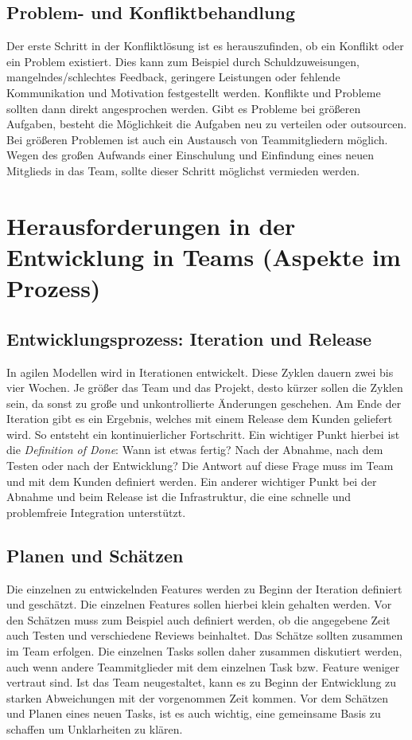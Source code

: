 \subsection{Problem- und Konfliktbehandlung}
Der erste Schritt in der Konfliktlösung ist es herauszufinden, ob ein Konflikt oder ein Problem existiert. Dies kann zum Beispiel durch Schuldzuweisungen, mangelndes/schlechtes Feedback, geringere Leistungen oder fehlende Kommunikation und Motivation festgestellt werden. Konflikte und Probleme sollten dann direkt angesprochen werden. Gibt es Probleme bei größeren Aufgaben, besteht die Möglichkeit die Aufgaben neu zu verteilen oder outsourcen. Bei größeren Problemen ist auch ein Austausch von Teammitgliedern möglich. Wegen des großen Aufwands einer Einschulung und Einfindung eines neuen Mitglieds in das Team, sollte dieser Schritt möglichst vermieden werden. 
\section{Herausforderungen in der Entwicklung in Teams (Aspekte im Prozess)}
\subsection{Entwicklungsprozess: Iteration und Release}
In agilen Modellen wird in Iterationen entwickelt. Diese Zyklen dauern zwei bis vier Wochen. Je größer das Team und das Projekt, desto kürzer sollen die Zyklen sein, da sonst zu große und unkontrollierte Änderungen geschehen. Am Ende der Iteration gibt es ein Ergebnis, welches mit einem Release dem Kunden geliefert wird. So entsteht ein kontinuierlicher Fortschritt. Ein wichtiger Punkt hierbei ist die \textit{Definition of Done}: Wann ist etwas fertig? Nach der Abnahme, nach dem Testen oder nach der Entwicklung? Die Antwort auf diese Frage muss im Team und mit dem Kunden definiert werden. Ein anderer wichtiger Punkt bei der Abnahme und beim Release ist die Infrastruktur, die eine schnelle und problemfreie Integration unterstützt. ~\parencite{ecksteinTeams}
\subsection{Planen und Schätzen}
Die einzelnen zu entwickelnden Features werden zu Beginn der Iteration definiert und geschätzt. Die einzelnen Features sollen hierbei klein gehalten werden. Vor den Schätzen muss zum Beispiel auch definiert werden, ob die angegebene Zeit auch Testen und verschiedene Reviews beinhaltet. Das Schätze sollten zusammen im Team erfolgen. Die einzelnen Tasks sollen daher zusammen diskutiert werden, auch wenn andere Teammitglieder mit dem einzelnen Task bzw. Feature weniger vertraut sind. Ist das Team neugestaltet, kann es zu Beginn der Entwicklung zu starken Abweichungen mit der vorgenommen Zeit kommen. Vor dem Schätzen und Planen eines neuen Tasks, ist es auch wichtig, eine gemeinsame Basis zu schaffen um Unklarheiten zu klären. 
